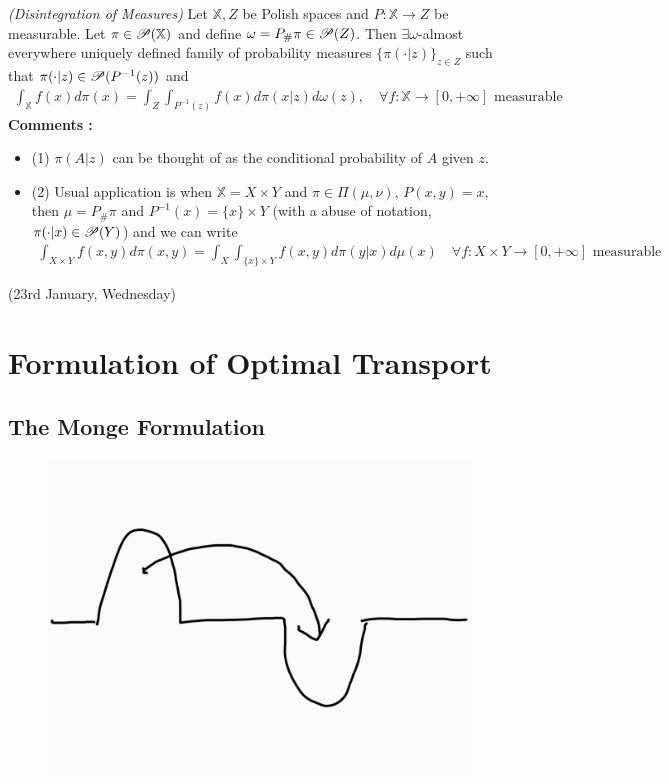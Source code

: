 \documentclass[12pt,a4paper]{article}
\renewenvironment{i}
{\begin{itemize} 
	}%
	{\end{itemize}
}
\begin{document}
 \emph{(Disintegration of Measures)} Let $\mathbb{X}, Z$ be Polish spaces and $P : \mathbb{X}\rightarrow Z$ be measurable. Let $\pi \in \mathscr{P}(\mathbb{X})$ and define $\omega= P_{\#} \pi \in \mathscr{P}(Z)$. Then $\exists \omega$-almost everywhere uniquely defined family of probability measures $\{\pi(\cdot |z)\}_{z\in Z}$ such that $\pi(\cdot |z) \in \mathscr{P}(P^{-1}(z))$ and
\begin{align*}
\int_{\mathbb{X}} f(x) d\pi(x) = \int_Z \int_{P^{-1}(z)} f(x) d\pi(x|z)d\omega(z), \quad \forall f: \mathbb{X}\rightarrow [0, +\infty] \text{ measurable}
\end{align*}
\textbf{Comments :}
\begin{i}
\item[(1)] $\pi(A|z)$ can be thought of as the conditional probability of $A$ given $z$.
\item[(2)] Usual application is when $\mathbb{X} = X\times Y$ and $\pi \in \Pi(\mu, \nu)$, $P(x,y) = x$, then $\mu = P_{\#}\pi$ and $P^{-1}(x) = \{x\} \times Y$ (with a abuse of notation, $\pi(\cdot |x) \in \mathscr{P}(Y)$) and we can write
\begin{align*}
\int_{X\times Y} f(x,y) d\pi(x,y) = \int_X \int_{\{x\}\times Y} f(x,y) d\pi(y|x) d\mu(x) \quad \forall f: X\times Y \rightarrow [0, +\infty] \text{ measurable}
\end{align*}
\end{i}
\s

\newday

(23rd January, Wednesday)

\section{Formulation of Optimal Transport}

\subsection{The Monge Formulation} 

\begin{figure}[h]
\begin{center}
    \includegraphics[scale=0.15]{1}
\end{center}
\end{figure}
\end{document}
